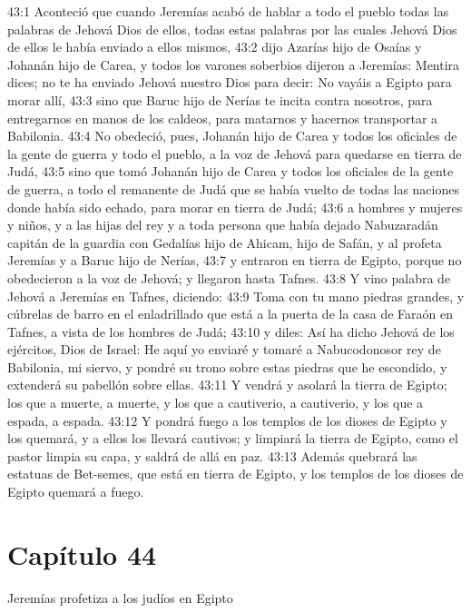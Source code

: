 43:1 Aconteció que cuando Jeremías acabó de hablar a todo el pueblo todas las palabras de Jehová Dios de ellos, todas estas palabras por las cuales Jehová Dios de ellos le había enviado a ellos mismos, 
43:2 dijo Azarías hijo de Osaías y Johanán hijo de Carea, y todos los varones soberbios dijeron a Jeremías: Mentira dices; no te ha enviado Jehová nuestro Dios para decir: No vayáis a Egipto para morar allí, 
43:3 sino que Baruc hijo de Nerías te incita contra nosotros, para entregarnos en manos de los caldeos, para matarnos y hacernos transportar a Babilonia. 
43:4 No obedeció, pues, Johanán hijo de Carea y todos los oficiales de la gente de guerra y todo el pueblo, a la voz de Jehová para quedarse en tierra de Judá, 
43:5 sino que tomó Johanán hijo de Carea y todos los oficiales de la gente de guerra, a todo el remanente de Judá que se había vuelto de todas las naciones donde había sido echado, para morar en tierra de Judá; 
43:6 a hombres y mujeres y niños, y a las hijas del rey y a toda persona que había dejado Nabuzaradán capitán de la guardia con Gedalías hijo de Ahicam, hijo de Safán, y al profeta Jeremías y a Baruc hijo de Nerías, 
43:7 y entraron en tierra de Egipto, porque no obedecieron a la voz de Jehová; y llegaron hasta Tafnes. 
43:8 Y vino palabra de Jehová a Jeremías en Tafnes, diciendo: 
43:9 Toma con tu mano piedras grandes, y cúbrelas de barro en el enladrillado que está a la puerta de la casa de Faraón en Tafnes, a vista de los hombres de Judá; 
43:10 y diles: Así ha dicho Jehová de los ejércitos, Dios de Israel: He aquí yo enviaré y tomaré a Nabucodonosor rey de Babilonia, mi siervo, y pondré su trono sobre estas piedras que he escondido, y extenderá su pabellón sobre ellas. 
43:11 Y vendrá y asolará la tierra de Egipto; los que a muerte, a muerte, y los que a cautiverio, a cautiverio, y los que a espada, a espada. 
43:12 Y pondrá fuego a los templos de los dioses de Egipto y los quemará, y a ellos los llevará cautivos; y limpiará la tierra de Egipto, como el pastor limpia su capa, y saldrá de allá en paz. 
43:13 Además quebrará las estatuas de Bet-semes, que está en tierra de Egipto, y los templos de los dioses de Egipto quemará a fuego. 
\section*{Capítulo 44 }
Jeremías profetiza a los judíos en Egipto 
 
